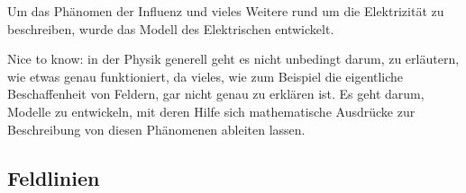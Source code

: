




%
%	





Um das Phänomen der Influenz und vieles Weitere rund um die Elektrizität zu beschreiben, wurde das Modell des Elektrischen entwickelt. 

\begin{leftbar}
Nice to know: in der Physik generell geht es nicht unbedingt darum, zu erläutern, wie etwas genau funktioniert, da vieles, wie zum Beispiel die eigentliche Beschaffenheit von Feldern, gar nicht genau zu erklären ist. Es geht darum, Modelle zu entwickeln, mit deren Hilfe sich mathematische Ausdrücke zur Beschreibung von diesen Phänomenen ableiten lassen.
\end{leftbar}


\subsection{Feldlinien}

